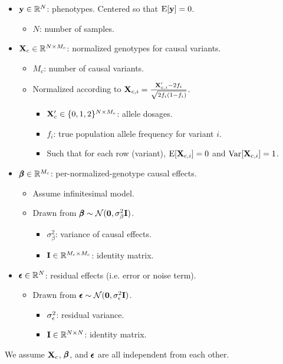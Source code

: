 \documentclass[12pt]{article}
\begin{document}
\begin{itemize}
    \item $\mathbf{y} \in \mathbb{R}^N$: phenotypes.
    Centered so that $\mathrm{E}[\mathbf{y}]=0$.
    \begin{itemize}
        \item $N$: number of samples.
    \end{itemize}
    \item $\mathbf{X}_c \in \mathbb{R}^{N \times M_c}$: normalized genotypes for causal variants.
    \begin{itemize}
        \item $M_c$: number of causal variants.
        \item Normalized according to
        $\mathbf{X}_{c,i} = \frac{\mathbf{X}'_{c,i} - 2 f_i}{\sqrt{2 f_i (1 - f_i)}}$.
        \begin{itemize}
            \item $\mathbf{X}'_c \in \{0,1,2\}^{N \times M_c}$: allele dosages.
            \item $f_i$: true population allele frequency for variant $i$.
            \item Such that for each row (variant), $\mathrm{E}[\mathbf{X}_{c,i}] = 0$ and $\mathrm{Var}[\mathbf{X}_{c,i}] = 1$.
        \end{itemize}
    \end{itemize}
    \item $\pmb{\beta} \in \mathbb{R}^{M_c}$: per-normalized-genotype causal effects.
    \begin{itemize}
        \item Assume infinitesimal model.
        \item Drawn from $\pmb{\beta} \sim \mathcal{N}(\textbf{0},\sigma_{\beta}^2 \mathbf{I} )$.
        \begin{itemize}
            \item $\sigma_{\beta}^2$: variance of causal effects.
            \item $\mathbf{I} \in \mathbb{R}^{M_c \times M_c}$: identity matrix.
        \end{itemize}
    \end{itemize}
    \item $\pmb{\epsilon} \in \mathbb{R}^N$: residual effects (i.e. error or noise term).
    \begin{itemize}
        \item Drawn from $\pmb{\epsilon} \sim \mathcal{N}(\textbf{0}, \sigma_{\epsilon}^2 \mathbf{I} )$.
        \begin{itemize}
            \item $\sigma_{\epsilon}^2$: residual variance.
            \item $\mathbf{I} \in \mathbb{R}^{N \times N}$: identity matrix.
        \end{itemize}
    \end{itemize}
\end{itemize}
We assume $\mathbf{X}_c$, $\pmb{\beta}$, and $\pmb{\epsilon}$ are all independent from each other.
\end{document}
